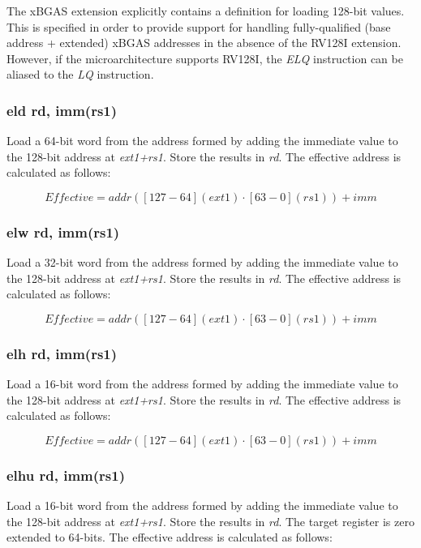 \documentclass{article}
\begin{document}
\begin{commentary}
The xBGAS extension explicitly contains a definition for loading 128-bit values.  
This is specified in order to provide support for handling fully-qualified (base 
address + extended) xBGAS addresses in the absence of the RV128I extension.  However, 
if the microarchitecture supports RV128I, the \textit{ELQ} instruction can be aliased 
to the \textit{LQ} instruction.
\end{commentary}


\subsubsection{eld rd, imm(rs1)}
Load a 64-bit word from the address formed by adding the immediate value to the 
128-bit address at \textit{ext1+rs1}.  Store the results in \textit{rd}.  The effective 
address is calculated as follows: 

\begin{equation}
Effective = addr([127-64](ext1) \cdot [63-0](rs1))+imm
\end{equation}

\subsubsection{elw rd, imm(rs1)}
Load a 32-bit word from the address formed by adding the immediate value to the 
128-bit address at \textit{ext1+rs1}.  Store the results in \textit{rd}.  The effective 
address is calculated as follows: 

\begin{equation}
Effective = addr([127-64](ext1) \cdot [63-0](rs1))+imm
\end{equation}

\subsubsection{elh rd, imm(rs1)}
Load a 16-bit word from the address formed by adding the immediate value to the 
128-bit address at \textit{ext1+rs1}.  Store the results in \textit{rd}.  The effective 
address is calculated as follows: 

\begin{equation}
Effective = addr([127-64](ext1) \cdot [63-0](rs1))+imm
\end{equation}

\subsubsection{elhu rd, imm(rs1)}
Load a 16-bit word from the address formed by adding the immediate value to the 
128-bit address at \textit{ext1+rs1}.  Store the results in \textit{rd}.  
 The target register is zero extended to 64-bits.  The effective 
address is calculated as follows: 
\end{document}
